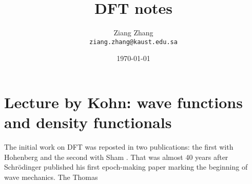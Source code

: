 \documentclass[a4paper, 11pt]{article}
\title{DFT notes}
\author{Ziang Zhang \\ \texttt{ziang.zhang@kaust.edu.sa}}
\date{\today}
\numberwithin{equation}{subsection}
\begin{document}
\maketitle
\tableofcontents

\section{Lecture by Kohn: wave functions and density functionals}

The initial work on DFT was reposted in two publications: the first with Hohenberg \cite{hohenberg_inhomogeneous_1964} and the second with Sham \cite{kohn_self-consistent_1965}. That was almost 40 years after Schr{\"o}dinger published his first epoch-making paper marking the beginning of wave mechanics. The Thomas

\newpage

\end{document}
